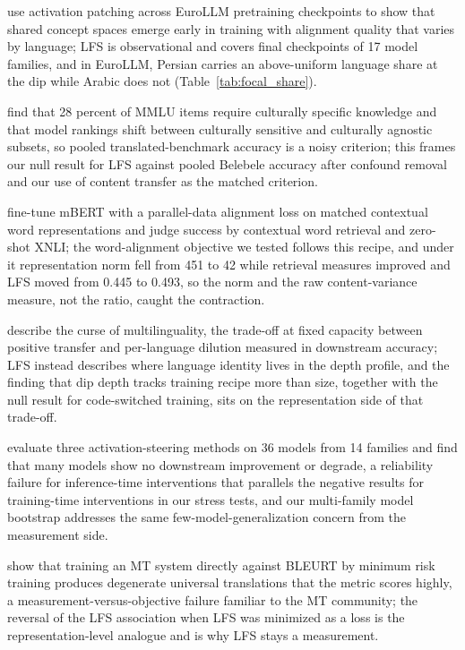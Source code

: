 \documentclass{article} %
\begin{document}
\citet{korner2026meanings} use activation patching across EuroLLM pretraining checkpoints to show that shared concept spaces emerge early in training with alignment quality that varies by language; LFS is observational and covers final checkpoints of 17 model families, and in EuroLLM, Persian carries an above-uniform language share at the dip while Arabic does not (Table~\ref{tab:focal_share}).

\citet{singh2025globalmmlu} find that 28 percent of MMLU items require culturally specific knowledge and that model rankings shift between culturally sensitive and culturally agnostic subsets, so pooled translated-benchmark accuracy is a noisy criterion; this frames our null result for LFS against pooled Belebele accuracy after confound removal and our use of content transfer as the matched criterion.

\citet{cao2020alignment} fine-tune mBERT with a parallel-data alignment loss on matched contextual word representations and judge success by contextual word retrieval and zero-shot XNLI; the word-alignment objective we tested follows this recipe, and under it representation norm fell from 451 to 42 while retrieval measures improved and LFS moved from 0.445 to 0.493, so the norm and the raw content-variance measure, not the ratio, caught the contraction.

\citet{conneau2020unsupervised} describe the curse of multilinguality, the trade-off at fixed capacity between positive transfer and per-language dilution measured in downstream accuracy; LFS instead describes where language identity lives in the depth profile, and the finding that dip depth tracks training recipe more than size, together with the null result for code-switched training, sits on the representation side of that trade-off.

\citet{dasilva2025steering} evaluate three activation-steering methods on 36 models from 14 families and find that many models show no downstream improvement or degrade, a reliability failure for inference-time interventions that parallels the negative results for training-time interventions in our stress tests, and our multi-family model bootstrap addresses the same few-model-generalization concern from the measurement side.

\citet{yan2023bleurt} show that training an MT system directly against BLEURT by minimum risk training produces degenerate universal translations that the metric scores highly, a measurement-versus-objective failure familiar to the MT community; the reversal of the LFS association when LFS was minimized as a loss is the representation-level analogue and is why LFS stays a measurement.
\end{document}
